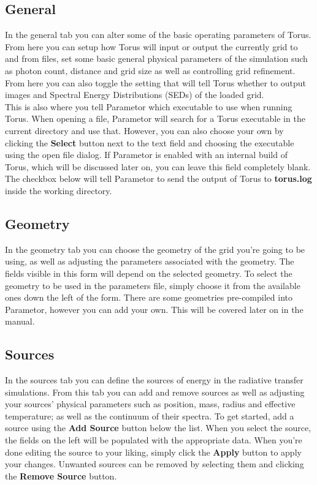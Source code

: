 \documentclass[a4paper,10pt]{article}
\begin{document}
\subsection{General}
In the general tab you can alter some of the basic operating parameters of Torus. From here you can setup how Torus will input or output the currently grid to and from files, set some basic general physical parameters of the simulation such as photon count, distance and  grid size as well as controlling grid refinement. From here you can also toggle the setting that will tell Torus whether to output images and Spectral Energy Distributions (SEDs) of the loaded grid.\\
This is also where you tell Parametor which executable to use when running Torus. When opening a file, Parametor will search for a Torus executable in the current directory and use that. However, you can also choose your own by clicking the \textbf{Select} button next to the text field and choosing the executable using the open file dialog. If Parametor is enabled with an internal build of Torus, which will be discussed later on, you can leave this field completely blank. The checkbox below will tell Parametor to send the output of Torus to \textbf{torus.log} inside the working directory.

\subsection{Geometry}
In the geometry tab you can choose the geometry of the grid you're going to be using, as well as adjusting the parameters associated with the geometry. The fields visible in this form will depend on the selected geometry. To select the geometry to be used in the parameters file, simply choose it from the available ones down the left of the form. There are some geometries pre-compiled into Parametor, however you can add your own. This will be covered later on in the manual.

\subsection{Sources}
In the sources tab you can define the sources of energy in the radiative transfer simulations. From this tab you can add and remove sources as well as adjusting your sources' physical parameters such as position, mass, radius and effective temperature; as well as the continuum of their spectra.
To get started, add a source using the \textbf{Add Source} button below the list. When you select the source, the fields on the left will be populated with the appropriate data. When you're done editing the source to your liking, simply click the \textbf{Apply} button to apply your changes. Unwanted sources can be removed by selecting them and clicking the \textbf{Remove Source} button.
\end{document}
